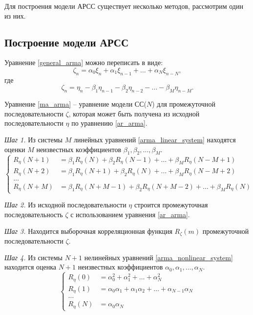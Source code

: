 \documentclass[12pt, fleqn]{article}
\begin{document}
{{{			Для построения модели АРСС существует несколько методов, рассмотрим один из них.
		}
		\subsection{Построение модели АРСС} {
			Уравнение \eqref{general_arma} можно переписать в виде:
			\begin{equation}\label{ma_arma}
				\zeta_n = \alpha_0 \xi_n + \alpha_1 \xi_{n - 1} + \dots + \alpha_N \xi_{n - N},
			\end{equation}
			где
			\begin{equation}\label{ar_arma}
				\zeta_n = \eta_n - \beta_1 \eta_{n - 1} - \beta_2 \eta_{n - 2} - \dots - \beta_M \eta_{n - M}.
			\end{equation}
					  
			Уравнение \eqref{ma_arma} -- уравнение модели СС($N$) для промежуточной последовательности $\zeta$, которая может быть получена из исходной последовательности $\eta$ по уравнению \eqref{ar_arma}. \medskip
					  
			\textit{Шаг 1.} Из системы $M$ линейных уравнений \eqref{arma_linear_system} находятся оценки $M$ неизвестных коэффициентов $\beta_1, \beta_2, \dots, \beta_M$.
			\begin{equation}\label{arma_linear_system}
				\left\{
				\begin{split}
					R_{\eta}(N + 1) &= \beta_1 R_{\eta}(N) + \beta_2 R_{\eta}(N - 1) + \dots + \beta_M R_{\eta}(N - M + 1) \\
					R_{\eta}(N + 2) &= \beta_1 R_{\eta}(N + 1) + \beta_2 R_{\eta}(N) + \dots + \beta_M R_{\eta}(N - M + 2) \\
					\dots           & \\
					R_{\eta}(N + M) &= \beta_1 R_{\eta}(N + M - 1) + \beta_2 R_{\eta}(N + M - 2) + \dots + \beta_M R_{\eta}(N)
				\end{split}
				\right.
			\end{equation}
					  
			\textit{Шаг 2.} Из исходной последовательности $\eta$ строится промежуточная последовательность $\zeta$ с использованием уравнения \eqref{ar_arma}.
					  
			\textit{Шаг 3.} Находится выборочная корреляционная функция $R_\zeta(m)$ промежуточной последовательности $\zeta$.
					  
			\textit{Шаг 4.} Из системы $N + 1$ нелинейных уравнений \eqref{arma_nonlinear_system} находится оценка $N + 1$ неизвестных коэффициентов $\alpha_0, \alpha_1, \dots, \alpha_N$.
			\begin{equation}\label{arma_nonlinear_system}
				\left\{
				\begin{split}
					R_{\eta}(0) &= \alpha_0^2 + \alpha_1^2 + \dots + \alpha_N^2 \\
					R_{\eta}(1) &= \alpha_0 \alpha_1 + \alpha_1 \alpha_2 + \dots + \alpha_{N - 1} \alpha_N \\
					\dots           & \\
					R_{\eta}(N) &= \alpha_0 \alpha_N
				\end{split}
				\right.
			\end{equation}
					  
}}}
\end{document}
